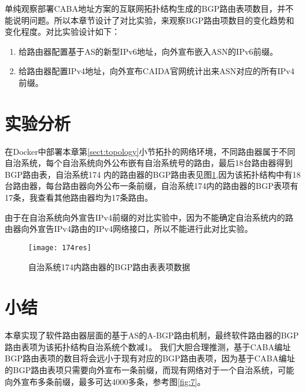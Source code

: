 单纯观察部署CABA地址方案的互联网拓扑结构生成的BGP路由表项数目，并不能说明问题。所以本章节设计了对比实验，来观察BGP路由项数目的变化趋势和变化程度。对比实验设计如下：

\begin{enumerate}
\item 给路由器配置基于AS的新型IPv6地址，向外宣布嵌入ASN的IPv6前缀。
\item 给路由器配置IPv4地址，向外宣布CAIDA官网统计出来ASN对应的所有IPv4前缀。
\end{enumerate}

\section{实验分析}
在Docker中部署本章第\ref{sect:topology}小节拓扑的网络环境，不同路由器属于不同自治系统，每个自治系统向外公布嵌有自治系统号的路由，最后18台路由器得到BGP路由表，自治系统174 内的路由器的BGP路由表见图\ref{fig:174res},因为该拓扑结构中有18台路由器，每台路由器向外公布一条前缀，自治系统174内的路由器的BGP表项有17条，我查看其他路由器均为17条路由。

由于在自治系统向外宣告IPv4前缀的对比实验中，因为不能确定自治系统内的路由器向外宣告IPv4路由的IPv4网络接口，所以不能进行此对比实验。

\begin{figure}
  \centering
  \texttt{[image: 174res]}\\
  \caption{自治系统174内路由器的BGP路由表表项数据}\label{fig:174res}
\end{figure}

\section{小结}

本章实现了软件路由器层面的基于AS的A-BGP路由机制，最终软件路由器的BGP路由表项为该拓扑结构自治系统个数减1。
我们大胆合理推测，基于CABA编址BGP路由表项的数目将会远小于现有对应的BGP路由表项，因为基于CABA编址的BGP路由表项只需要向外宣布一条前缀，而现有网络对于一个自治系统，可能向外宣布多条前缀，最多可达4000多条，参考图\ref{fig:7}。
